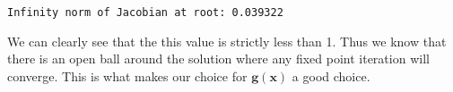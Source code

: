 \documentclass[11pt]{article}
\begin{document}
    \begin{Verbatim}[commandchars=\\\{\}]
Infinity norm of Jacobian at root: 0.039322
    \end{Verbatim}

    We can clearly see that the this value is strictly less than 1. Thus we
know that there is an open ball around the solution where any fixed
point iteration will converge. This is what makes our choice for
\(\mathbf{g}(\mathbf{x})\) a good choice.


    
    
    
\end{document}
